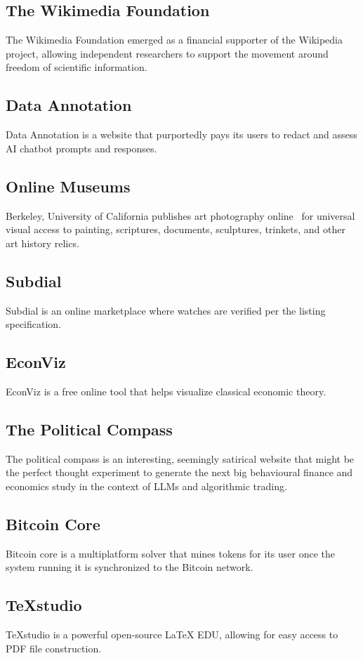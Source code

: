 \documentclass[11pt]{article}
\begin{document}
\subsection{The Wikimedia Foundation~\cite{a2018_wikimedia}}
The Wikimedia Foundation emerged as a financial supporter of the Wikipedia project, allowing independent researchers to support the movement around freedom of scientific information.
\subsection{Data Annotation~\cite{data}}
Data Annotation is a website that purportedly pays its users to redact and assess AI chatbot prompts and responses.
\subsection{Online Museums}
Berkeley, University of California publishes art photography online~\cite{a2024_library} for universal visual access to painting, scriptures, documents, sculptures, trinkets, and other art history relics.
\subsection{Subdial~\cite{a2023_subdial}}
Subdial is an online marketplace where watches are verified per the listing specification.
\subsection{EconViz~\cite{econvizorgmacroeconomicvisualizations_2025_econvizorg}}
EconViz is a free online tool that helps visualize classical economic theory.
\subsection{The Political Compass~\cite{thepoliticalcompass_2018_the}}
The political compass is an interesting, seemingly satirical website that might be the perfect thought experiment to generate the next big behavioural finance and economics study in the context of LLMs and algorithmic trading.
\subsection{Bitcoin Core~\cite{bitcoin}}
Bitcoin core is a multiplatform solver that mines tokens for its user once the system running it is synchronized to the Bitcoin network.
\subsection{TeXstudio}
TeXstudio is a powerful open-source LaTeX EDU, allowing for easy access to PDF file construction.
\end{document}
